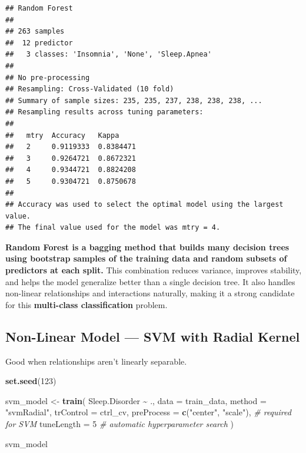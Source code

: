 \documentclass[
]{article}
\newenvironment{Shaded}{\begin{snugshade}}{\end{snugshade}}
\newcommand{\AttributeTok}[1]{\textcolor[rgb]{0.13,0.29,0.53}{#1}}
\newcommand{\CommentTok}[1]{\textcolor[rgb]{0.56,0.35,0.01}{\textit{#1}}}
\newcommand{\DecValTok}[1]{\textcolor[rgb]{0.00,0.00,0.81}{#1}}
\newcommand{\FunctionTok}[1]{\textcolor[rgb]{0.13,0.29,0.53}{\textbf{#1}}}
\newcommand{\NormalTok}[1]{#1}
\newcommand{\OtherTok}[1]{\textcolor[rgb]{0.56,0.35,0.01}{#1}}
\newcommand{\SpecialCharTok}[1]{\textcolor[rgb]{0.81,0.36,0.00}{\textbf{#1}}}
\newcommand{\StringTok}[1]{\textcolor[rgb]{0.31,0.60,0.02}{#1}}
\begin{document}
\begin{verbatim}
## Random Forest 
## 
## 263 samples
##  12 predictor
##   3 classes: 'Insomnia', 'None', 'Sleep.Apnea' 
## 
## No pre-processing
## Resampling: Cross-Validated (10 fold) 
## Summary of sample sizes: 235, 235, 237, 238, 238, 238, ... 
## Resampling results across tuning parameters:
## 
##   mtry  Accuracy   Kappa    
##   2     0.9119333  0.8384471
##   3     0.9264721  0.8672321
##   4     0.9344721  0.8824208
##   5     0.9304721  0.8750678
## 
## Accuracy was used to select the optimal model using the largest value.
## The final value used for the model was mtry = 4.
\end{verbatim}

\textbf{Random Forest is a bagging method that builds many decision
trees using bootstrap samples of the training data and random subsets of
predictors at each split.} This combination reduces variance, improves
stability, and helps the model generalize better than a single decision
tree. It also handles non-linear relationships and interactions
naturally, making it a strong candidate for this \textbf{multi-class
classification} problem.

\subsection{Non-Linear Model --- SVM with Radial
Kernel}\label{non-linear-model-svm-with-radial-kernel}

Good when relationships aren't linearly separable.

\begin{Shaded}
\begin{Highlighting}[]
\FunctionTok{set.seed}\NormalTok{(}\DecValTok{123}\NormalTok{)}

\NormalTok{svm\_model }\OtherTok{\textless{}{-}} \FunctionTok{train}\NormalTok{(}
\NormalTok{  Sleep.Disorder }\SpecialCharTok{\textasciitilde{}}\NormalTok{ .,}
  \AttributeTok{data =}\NormalTok{ train\_data,}
  \AttributeTok{method =} \StringTok{"svmRadial"}\NormalTok{,}
  \AttributeTok{trControl =}\NormalTok{ ctrl\_cv,}
  \AttributeTok{preProcess =} \FunctionTok{c}\NormalTok{(}\StringTok{"center"}\NormalTok{, }\StringTok{"scale"}\NormalTok{),  }\CommentTok{\# required for SVM}
  \AttributeTok{tuneLength =} \DecValTok{5}                      \CommentTok{\# automatic hyperparameter search}
\NormalTok{)}

\NormalTok{svm\_model}
\end{Highlighting}
\end{Shaded}
\end{document}
